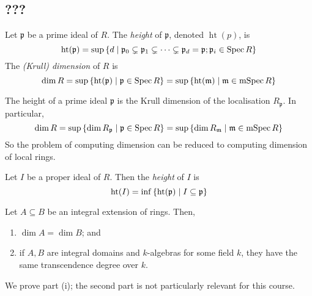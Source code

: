 \subsection{???}
\begin{definition}
    Let \( \mathfrak p \) be a prime ideal of \( R \).
    The \emph{height} of \( \mathfrak p \), denoted \( \operatorname{ht}(p) \), is
    \[ \operatorname{ht}(\mathfrak p) = \sup \qty{ d \mid \mathfrak p_0 \subsetneq \mathfrak p_1 \subsetneq \dots \subsetneq \mathfrak p_d = \mathfrak p; \mathfrak p_i \in \operatorname{Spec}R } \]
    The \emph{(Krull) dimension} of \( R \) is
    \[ \dim R = \sup \qty{\operatorname{ht}(\mathfrak p) \mid \mathfrak p \in \operatorname{Spec}R} = \sup \qty{\operatorname{ht}(\mathfrak m) \mid \mathfrak m \in \operatorname{mSpec}R} \]
\end{definition}
\begin{remark}
    The height of a prime ideal \( \mathfrak p \) is the Krull dimension of the localisation \( R_{\mathfrak p} \).
    In particular,
    \[ \dim R = \sup \qty{\dim R_{\mathfrak p} \mid \mathfrak p \in \operatorname{Spec}R} = \sup \qty{\dim R_{\mathfrak m} \mid \mathfrak m \in \operatorname{mSpec}R} \]
    So the problem of computing dimension can be reduced to computing dimension of local rings.
\end{remark}
\begin{definition}
    Let \( I \) be a proper ideal of \( R \).
    Then the \emph{height} of \( I \) is
    \[ \operatorname{ht}(I) = \inf \qty{\operatorname{ht}(\mathfrak p) \mid I \subseteq \mathfrak p} \]
\end{definition}
\begin{proposition}
    Let \( A \subseteq B \) be an integral extension of rings.
    Then,
    \begin{enumerate}
        \item \( \dim A = \dim B \); and
        \item if \( A, B \) are integral domains and \( k \)-algebras for some field \( k \), they have the same transcendence degree over \( k \).
    \end{enumerate}
\end{proposition}
We prove part (i); the second part is not particularly relevant for this course.
